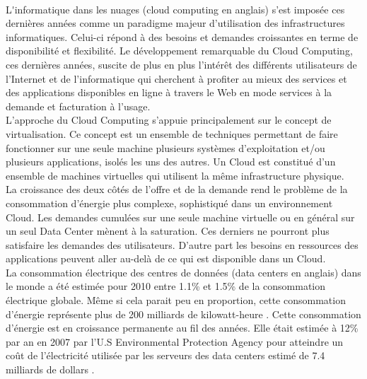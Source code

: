\thispagestyle{empty}
\begin{center}
\\
\end{center}
\vspace{20mm}

\begin{onehalfspace}
\lettrine[nindent=1em,lines=3]{L}'informatique dans les nuages (cloud computing en anglais) s’est imposée ces dernières années comme un paradigme majeur d’utilisation des infrastructures informatiques. Celui-ci répond à des besoins et demandes croissantes en terme de disponibilité et flexibilité. 
Le développement remarquable du Cloud Computing, ces dernières années, suscite de plus en plus l’intérêt des différents utilisateurs de l’Internet et de l’informatique qui cherchent à profiter au mieux des services et des applications disponibles en ligne à travers le Web en mode services à la demande et facturation à l’usage.\\

L’approche du Cloud Computing s’appuie principalement sur le concept de virtualisation. Ce concept est un ensemble de techniques permettant de faire fonctionner sur une seule machine plusieurs systèmes d’exploitation et/ou plusieurs applications, isolés les uns des autres. Un Cloud est constitué d’un ensemble de machines virtuelles qui utilisent la même infrastructure physique.\\

La croissance des deux côtés de l’offre et de la demande rend le problème de la consommation d’énergie plus complexe, sophistiqué dans un environnement Cloud. Les demandes cumulées sur une seule machine virtuelle ou en général sur un seul Data Center mènent à la saturation. Ces derniers ne pourront plus satisfaire les demandes des utilisateurs. D’autre part les besoins en ressources des applications peuvent aller au-delà de ce qui est disponible dans un Cloud.\\

La consommation électrique des centres de données (data centers en anglais) dans le monde a été estimée pour 2010 entre 1.1\% et 1.5\% de la consommation électrique globale. Même si cela parait peu en proportion, cette consommation d’énergie représente plus de 200 milliards de kilowatt-heure \cite{ref48}. Cette consommation d’énergie est en croissance permanente au fil des années. Elle était estimée à 12\% par an en 2007 par l’U.S Environmental Protection Agency pour atteindre un coût de l’électricité utilisée par les serveurs des data centers estimé de 7.4 milliards de dollars \cite{EPA_2007}.\\


\end{onehalfspace}
